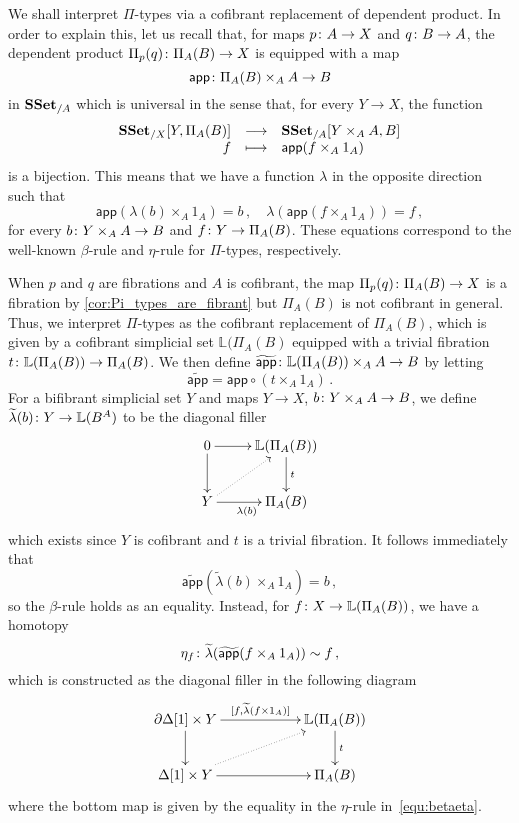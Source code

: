 \documentclass[reqno,10pt,a4paper,oneside,draft]{amsart}
\begin{document}
\begin{remark}[$\Pi$-types] \label{rem:pi-types}
We shall interpret $\Pi$-types via a cofibrant replacement of dependent product. In order to explain this, let
us recall that, for maps $p \colon A \to X$ and $q \colon B \to A$,  the dependent product $\Pi_p(q) \colon \Pi_A(B)
\to X$ is equipped with a map
\[
\mathsf{app} \colon \Pi_A(B) \times_A  A \to B
\] 
in $\mathbf{SSet}_{/A}$ which is universal in the sense that, for every  $Y \to X$, the function
\[
\begin{array}{rcl} 
 \mathbf{SSet}_{/X}[ Y , \Pi_A(B)] & \longrightarrow &  \mathbf{SSet}_{/A}[Y \times_A A, B]  \\
  f & \longmapsto & \mathsf{app}(f \times_A 1_A) 
  \end{array} 
 \]
 is a bijection. This means that we have a function $\lambda$ in the opposite direction such that  
 \begin{equation}
 \label{equ:betaeta}
 \mathsf{app}(\lambda(b) \times_A 1_A) = b   \, , \quad
 \lambda( \mathsf{app}(f \times_A 1_A)) = f \, ,
 \end{equation}
 for every $b \colon Y \times_A A \to B$ and $f \colon Y \to \Pi_A(B)$.  These equations correspond to the
 well-known $\beta$-rule and $\eta$-rule for $\Pi$-types, respectively.
 
 When $p$ and $q$ are fibrations and $A$ is cofibrant, the map 
 $\Pi_p(q) \colon \Pi_A(B) \to X$ is a fibration by \cref{cor:Pi_types_are_fibrant} but $\Pi_A(B)$ is not cofibrant
 in general. Thus, we interpret  $\Pi$-types as the 
 cofibrant replacement  of $\Pi_A(B)$, which is given by a cofibrant simplicial set
 $\mathbb{L}(\Pi_A(B)$  equipped with
 a trivial fibration $t \colon \mathbb{L}(\Pi_A(B)) \to \Pi_A(B)$. 
We then define $\widetilde{\mathsf{app}} \colon   \mathbb{L}(\Pi_A(B)) \times_A A \to B$ by letting
\[
\widetilde{\mathsf{app}}  = \mathsf{app} \circ (t \times_A 1_A) \, .
\]
For a bifibrant simplicial set $Y$ and maps $Y \to X$,  $b \colon Y \times_A A \to B$, we define $\widetilde{\lambda}(b) \colon Y \to \mathbb{L}(B^A)$ to be the
diagonal filler
\[
\xymatrix{
0 \ar[r] \ar[d] & \mathbb{L}(\Pi_A(B))  \ar[d]^t \\
Y \ar[r]_{\lambda(b)} \ar@{.>}[ur] & \Pi_A(B)}
\]
which exists since $Y$ is cofibrant and $t$ is a trivial fibration. It follows immediately that
\[
 \widetilde{\mathsf{app}}(\widetilde{\lambda}(b) \times_A 1_A) = b \, ,
\]
so the $\beta$-rule holds as an equality. Instead, for $f \colon X \to \mathbb{L}(\Pi_A(B))$, we have a homotopy
\[
\eta_f  \colon \widetilde{\lambda}( \widetilde{\mathsf{app}}(f \times_A 1_A)) \sim  f  \, ,
\]
which is constructed as the diagonal filler in the following diagram
\[
\xymatrix@C=2cm{
\partial \Delta[1] \times Y \ar[r]^-{[f, \widetilde{\lambda}(f \times 1_A)]} \ar[d] & \mathbb{L}(\Pi_A(B)) \ar[d]^t \\
\Delta[1] \times Y \ar[r] \ar@{.>}[ur] & \Pi_A(B) }
\]
where the bottom map is given by the equality in the $\eta$-rule in~\eqref{equ:betaeta}.
\end{remark}
\end{document}
